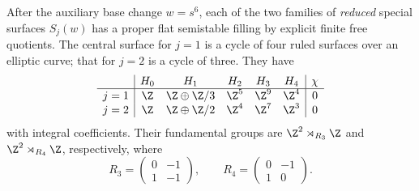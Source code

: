 \begin{proposition}\label{fam:src:E.2.1}\label{fam:st:E.2.1}
After the auxiliary base change $w=s^6$, each of the two families of
\emph{reduced} special surfaces $S_j(w)$ has a proper flat
semistable filling by explicit finite free quotients. The central
surface for $j=1$ is a cycle of four ruled surfaces over an elliptic
curve; that for $j=2$ is a cycle of three. They have
\[
\begin{array}{c|ccccc|c}
 &H_0&H_1&H_2&H_3&H_4&\chi\\\hline
 j=1&\Z&\Z\oplus\Z/3&\Z^5&\Z^9&\Z^4&0\\
 j=2&\Z&\Z\oplus\Z/2&\Z^4&\Z^7&\Z^3&0
\end{array}
\]
with integral coefficients. Their fundamental groups are
$\Z^2\rtimes_{R_3}\Z$ and $\Z^2\rtimes_{R_4}\Z$, respectively,
where
\[
 R_3=\begin{pmatrix}0&-1\\1&-1\end{pmatrix},\qquad
 R_4=\begin{pmatrix}0&-1\\1&0\end{pmatrix}.
\]
\end{proposition}


